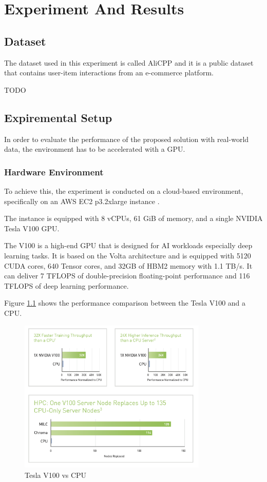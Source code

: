 \chapter{Experiment And Results}
\minitoc

\section{Dataset}

The dataset used in this experiment is called AliCPP and it is a public dataset that contains user-item interactions from an e-commerce platform.

TODO


\section{Expiremental Setup}

In order to evaluate the performance of the proposed solution with real-world data, the environment has to be accelerated with a GPU.

\subsection{Hardware Environment}

To achieve this, the experiment is conducted on a cloud-based environment, specifically on an AWS EC2 p3.2xlarge instance \cite{AwsEc2P3}.

The instance is equipped with 8 vCPUs, 61 GiB of memory, and a single NVIDIA Tesla V100 GPU.

The V100 is a high-end GPU that is designed for AI workloads especially deep learning tasks.
It is based on the Volta architecture and is equipped with 5120 CUDA cores, 640 Tensor cores, and 32GB of HBM2 memory with 1.1 TB/s.
It can deliver 7 TFLOPS of double-precision floating-point performance and 116 TFLOPS of deep learning performance.

Figure \ref{fig:V100vsCPU} shows the performance comparison between the Tesla V100 and a CPU.


\begin{figure}[H]
    \centering
    \includegraphics[width=0.8\textwidth]{assets/v100-vs-cpu.png}
    \caption[Tesla V100 vs CPU]{Tesla V100 vs CPU \cite{NvidiaV100DataSheet}}
    \label{fig:V100vsCPU}
\end{figure}

